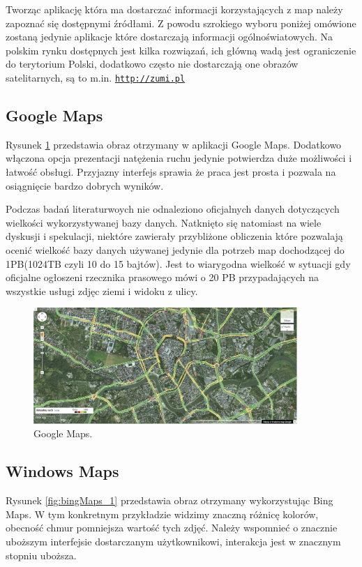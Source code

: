 Tworząc aplikację która ma dostarczać informacji korzystających z map należy zapoznać się dostępnymi źródłami. Z powodu szrokiego wyboru poniżej omówione zostaną jedynie aplikacje które dostarczają informacji ogólnoświatowych. Na polskim rynku dostępnych jest kilka rozwiązań, ich główną wadą jest ograniczenie do terytorium Polski, dodatkowo często nie dostarczają one obrazów satelitarnych, są to m.in. \underline{\texttt{http://zumi.pl}}


\subsection{Google Maps}
\label{subsec:Google Maps}
\nocite{googlemapsbegin}
Rysunek \ref{fig:googleMaps_1} przedstawia obraz otrzymany w aplikacji Google Maps. Dodatkowo włączona opcja prezentacji natężenia ruchu jedynie potwierdza duże możliwości i łatwość obsługi. Przyjazny interfejs sprawia że praca jest prosta i pozwala na osiągnięcie bardzo dobrych wyników.

Podczas badań literaturwoych nie odnaleziono oficjalnych danych dotyczących wielkości wykorzystywanej bazy danych. 
Natknięto się natomiast na wiele dyskusji i spekulacji, niektóre zawierały przybliżone obliczenia które pozwalają ocenić wielkość bazy danych używanej jedynie dla potrzeb map dochodzącej do 1PB(1024TB czyli 10 do 15 bajtów).
Jest to wiarygodna wielkość w sytuacji gdy oficjalne ogłoszeni rzecznika prasowego mówi o 20 PB przypadających na wszystkie usługi zdjęc ziemi i widoku z ulicy.\cite{googledatabase}


\begin{figure}[H]
  \centering
    \includegraphics[width=100mm]{ge/gm_1.jpg}
  \caption{Google Maps.}
  \label{fig:googleMaps_1}
\end{figure}


\subsection{Windows Maps}
\label{subsec:Windows Maps}

Rysunek \ref{fig:bingMaps_1} przedstawia obraz otrzymany wykorzystując Bing Maps. W tym konkretnym przykładzie widzimy znaczną różnicę kolorów, obecność chmur pomniejsza wartość tych zdjęć. Należy wspomnieć o znacznie uboższym interfejsie dostarczanym użytkownikowi, interakcja jest w znacznym stopniu uboższa.

